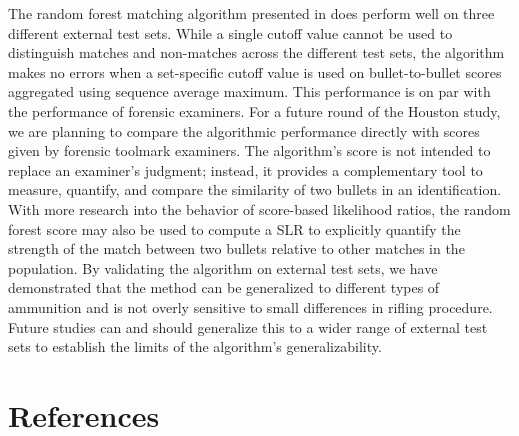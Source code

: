 \documentclass[doubleblind]{elsarticle}\usepackage[]{graphicx}\usepackage[]{color}
\begin{document}
The random forest matching algorithm presented in \citet{aoas2} does perform well on three different external test sets. While a single cutoff value cannot be used to distinguish matches and non-matches across the different test sets, the algorithm makes no errors when a set-specific cutoff value is used on bullet-to-bullet scores aggregated using sequence average maximum. This performance is on par with the performance of forensic examiners. For a future round of the Houston study, we are planning to compare the algorithmic performance directly with scores given by forensic toolmark examiners. The algorithm's score is not intended to replace an examiner's judgment; instead, it provides a complementary tool to measure, quantify, and compare the similarity of two bullets in an identification. With more research into the behavior of score-based likelihood ratios, the random forest score may also be used to compute a SLR to explicitly quantify the strength of the match between two bullets relative to other matches in the population.
By validating the algorithm on external test sets, we have demonstrated that the method can be generalized to different types of ammunition and is not overly sensitive to small differences in rifling procedure. Future studies can and should generalize this to a wider range of external test sets to establish the limits of the algorithm's generalizability.



\section{References}


\end{document}

